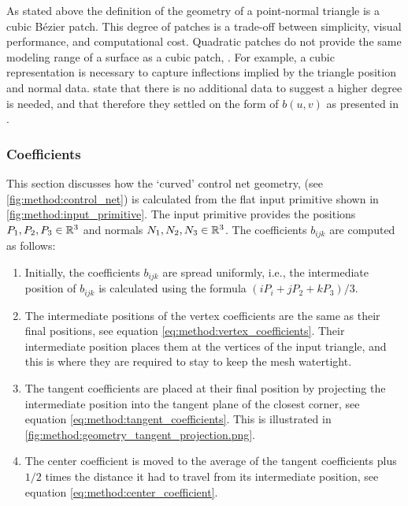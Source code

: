 As stated above the definition of the geometry of a point-normal triangle is a cubic Bézier patch. This degree of patches is a trade-off between simplicity, visual performance, and computational cost. Quadratic patches do not provide the same modeling range of a surface as a cubic patch, \citeauthor{boubekeur2008phong} \cite{boubekeur2008phong}. For example, a cubic representation is necessary to capture inflections implied by the triangle position and normal data. \citeauthor{vlachos2001curved} state that there is no additional data to suggest a higher degree is needed, and that therefore they settled on the form of $b(u,v)$ as presented in .

\subsubsection{Coefficients} \label{sss:control_point_construction}
This section discusses how the `curved' control net geometry, (see \cref{fig:method:control_net}) is calculated from the flat input primitive shown in \cref{fig:method:input_primitive}. The input primitive provides the positions $P_1, P_2, P_3 \in \mathbb{R}^3$ and normals $N_1, N_2, N_3 \in \mathbb{R}^3$. The coefficients $b_{ijk}$ are computed as follows:
%
\begin{enumerate}[label=(\roman*)]
	\item 
		Initially, the coefficients $b_{ijk}$ are spread uniformly, i.e., the intermediate position of $b_{ijk}$ is calculated using the formula $(i P_i + j P_2 + kP_3) / 3$. 
	\item 
		The intermediate positions of the vertex coefficients are the same as their final positions, see equation \eqref{eq:method:vertex_coefficients}. Their intermediate position places them at the vertices of the input triangle, and this is where they are required to stay to keep the mesh watertight.
	\item 
		The tangent coefficients are placed at their final position by projecting the intermediate position into the tangent plane of the closest corner, see equation \eqref{eq:method:tangent_coefficients}. This is illustrated in \cref{fig:method:geometry_tangent_projection.png}.
	\item The center coefficient is moved to the average of the tangent coefficients plus $1/2$ times the distance it had to travel from its intermediate position, see equation \eqref{eq:method:center_coefficient}.
\end{enumerate}
%
